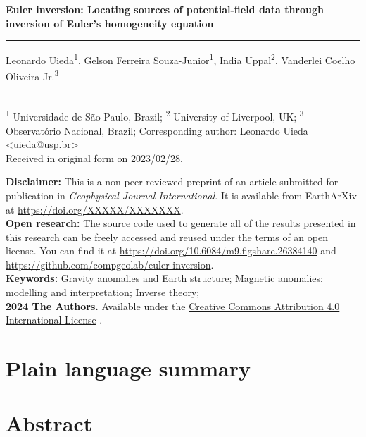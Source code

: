 \documentclass[onecolumn,10pt]{article}
\makeatletter
\newcommand{\Title}{Euler inversion: Locating sources of potential-field data through inversion of Euler's homogeneity equation}
\newcommand{\Year}{2024}
\newcommand{\SubmittedOn}{2023/02/28}
\newcommand{\PublishedOn}{2023/02/28}
\newcommand{\AuthorShort}{Uieda et al.}
\newcommand{\Authors}{%
  Leonardo Uieda\textsuperscript{1},
  Gelson Ferreira Souza-Junior\textsuperscript{1},
  India Uppal\textsuperscript{2},
  Vanderlei Coelho Oliveira Jr.\textsuperscript{3}
}
\newcommand{\Email}{uieda@usp.br}
\newcommand{\Corresponding}{%
  Corresponding author: Leonardo Uieda <\href{mailto:\Email}{\Email}>
}
\newcommand{\Affiliations}{%
  \textsuperscript{1} Universidade de São Paulo, Brazil;
  \textsuperscript{2} University of Liverpool, UK;
  \textsuperscript{3} Observatório Nacional, Brazil;
}
\newcommand{\Journal}{Geophysical Journal International}
\newcommand{\JournalDOI}{YYYYY/YYYYYYY}
\newcommand{\PreprintDOI}{XXXXX/XXXXXXX}
\newcommand{\ArchiveDOI}{10.6084/m9.figshare.26384140}
\newcommand{\GitHubRepository}{compgeolab/euler-inversion}
\newcommand{\Keywords}{%
  Gravity anomalies and Earth structure; 
  Magnetic anomalies: modelling and interpretation; 
  Inverse theory;
}
\makeatother
\begin{document}
\thispagestyle{plain}
\begin{FlushLeft}
  \begin{spacing}{2}
    {\LARGE\bfseries \Title}
  \end{spacing}
  {\color{lightgray}\hrule height 1.5pt}
  \vspace{0.3cm}
  \Authors
  \\[0.2cm]
  {\footnotesize \Affiliations}
  \newline
  {\footnotesize \Corresponding}
  \\[0.2cm]
  {\footnotesize
    Received in original form on \SubmittedOn.
  }
\end{FlushLeft}

\begin{summarybox}
  \noindent
  \textbf{Disclaimer:}
  This is a non-peer reviewed preprint of an article submitted for publication
  in \textit{\Journal{}}. It is available from EarthArXiv at
  \url{https://doi.org/\PreprintDOI}.
  \\[0.25cm]
  \noindent
  \textbf{Open research:}
  The source code used to generate all of the results presented in this
  research can be freely accessed and reused under the terms of an open license.
  You can find it at \url{https://doi.org/\ArchiveDOI} and
  \url{https://github.com/\GitHubRepository}.
  \\[0.25cm]
  \noindent
  \textbf{Keywords:} \Keywords{}
  \\[0.25cm]
  \noindent
  \textbf{\textcopyright{} \Year{} The Authors.}
  Available under the \href{https://creativecommons.org/licenses/by/4.0/}{Creative Commons Attribution 4.0 International License}
  \faCreativeCommons\faCreativeCommonsBy{}.
\end{summarybox}

\section*{\normalsize Plain language summary}
\begingroup
   \small  \par
\endgroup

\section*{\normalsize Abstract}
\begingroup
   \small  \par
\endgroup





\end{document}
